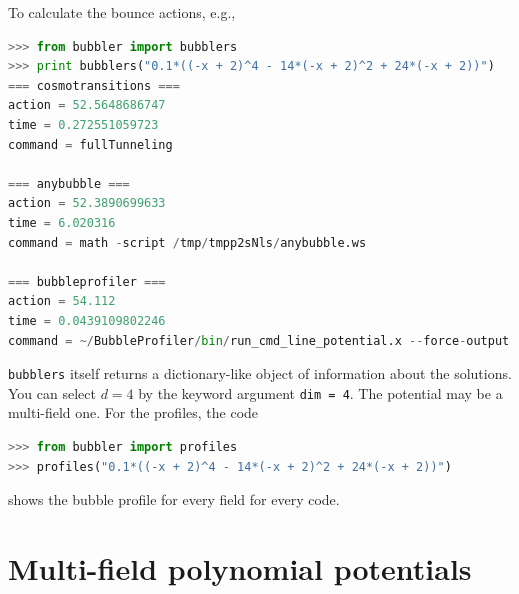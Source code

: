 \documentclass[final,3p,11pt,pdflatex]{elsarticle}
\newcommand{\code}[1]{\ifmmode\text{\nolinkurl{#1}}\else\nolinkurl{#1}\fi}
\begin{document}
To calculate the bounce actions, e.g.,
\begin{lstlisting}[language=python]
>>> from bubbler import bubblers
>>> print bubblers("0.1*((-x + 2)^4 - 14*(-x + 2)^2 + 24*(-x + 2))")
=== cosmotransitions ===
action = 52.5648686747
time = 0.272551059723
command = fullTunneling

=== anybubble ===
action = 52.3890699633
time = 6.020316
command = math -script /tmp/tmpp2sNls/anybubble.ws

=== bubbleprofiler ===
action = 54.112
time = 0.0439109802246
command = ~/BubbleProfiler/bin/run_cmd_line_potential.x --force-output --write-profiles --potential '0.1*((-x + 2)^4 - 14*(-x + 2)^2 + 24*(-x + 2))' --field 'x' --output-file /tmp/tmputKUDO --initial-step-size 0.01 --domain-start -1.0 --domain-end -1.0 --local-minimum 0.0 --global-minimum 5.0 --rtol-action 0.001 --rtol-fields 0.001 --integration-method runge-kutta-4 --n-dims 3  > /dev/null 2>&1
\end{lstlisting}
\code{bubblers} itself returns a dictionary-like object of information about the solutions. You can select $d=4$ by the keyword argument \code{dim = 4}. The potential may be a multi-field one.
For the profiles, the code
\begin{lstlisting}[language=python]
>>> from bubbler import profiles
>>> profiles("0.1*((-x + 2)^4 - 14*(-x + 2)^2 + 24*(-x + 2))")
\end{lstlisting}
shows the bubble profile for every field for every code.

\section{Multi-field polynomial potentials}\label{app:test_potentials}
\end{document}
